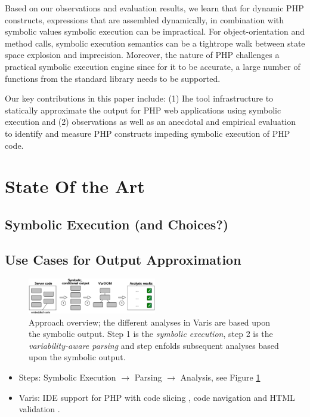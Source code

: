 \documentclass[preprint]{sig-alternate-05-2015}
\begin{document}
Based on our observations and evaluation results, we learn that for dynamic PHP constructs, expressions that are assembled dynamically, in combination with symbolic values symbolic execution can be impractical. For object-orientation and method calls, symbolic execution semantics can be a tightrope walk between state space explosion and imprecision. Moreover, the nature of PHP challenges a practical symbolic execution engine since  for it to be accurate, a large number of functions from the standard library needs to be supported.

Our key contributions in this paper include: (1) Ihe tool infrastructure to statically approximate the output for PHP web applications using symbolic execution and (2) observations as well as an anecdotal and empirical evaluation to identify and measure PHP constructs impeding symbolic execution of PHP code.



\section{State Of the Art}
\subsection{Symbolic Execution (and Choices?)}
\subsection{Use Cases for Output Approximation}

\begin{figure}
	
	\centering
	\includegraphics[width=0.5\textwidth]{images-paper/approach}
	\caption{Approach overview; the different analyses in Varis are based upon the
	symbolic output. Step 1 is the \emph{symbolic execution}, step 2 is the
	\emph{variability-aware parsing} and step enfolds subsequent analyses based
	upon the symbolic output.}
	\label{approach}
\end{figure}

\begin{itemize}
  \item Steps: Symbolic Execution $\rightarrow$ Parsing $\rightarrow$
  Analysis, see Figure \ref{approach}
  \item Varis: IDE support \cite{Nguyen:2015:VIS:2819009.2819140} for PHP with
  code slicing \cite{Nguyen:2015:CPS:2786805.2786872}, code navigation
  \cite{Nguyen:2014:BCG:2635868.2635928} and
  HTML validation \cite{Nguyen:2011:AFH:2190078.2190142}.
\end{itemize}
\end{document}
